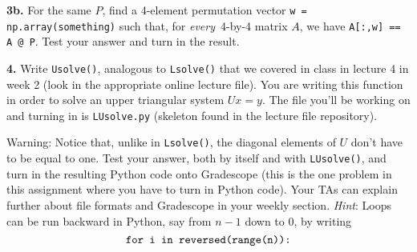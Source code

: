 \documentclass[11pt]{article}
\begin{document}
\par\medskip
\textbf {3b.} For the same $P$, 
find a 4-element permutation vector {\tt w = np.array(something)}
such that, for {\em every}\, 4-by-4 matrix $A$, 
we have {\tt A[:,w] == A @ P}. 
Test your answer and turn in the result.

\par\bigskip
\textbf {4.}
Write {\tt Usolve()}, analogous to {\tt Lsolve()} that we covered in class in lecture 4 in week 2 (look in the appropriate online lecture file). You are writing this function in order to solve an upper triangular system $Ux=y$. The file you'll be working on and turning in is {\tt LUsolve.py} (skeleton found in the lecture file repository). 

Warning: Notice that, unlike in {\tt Lsolve()}, 
the diagonal elements of $U$ don't have to be equal to one.
Test your answer, both by itself and with {\tt LUsolve()},
and turn in the resulting Python code onto Gradescope (this is the one problem in this assignment where you have to turn in Python code). Your TAs can explain further about file formats and Gradescope in your weekly section.
\textit{Hint}: Loops can be run backward in Python, 
say from $n-1$ down to $0$, by writing
$$\mbox{\tt for i in reversed(range(n)):}$$
\end{document}
